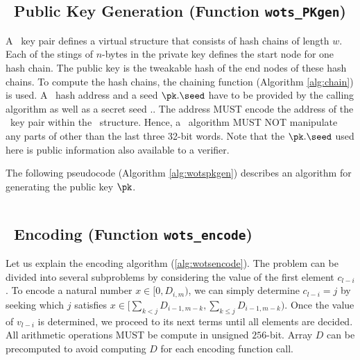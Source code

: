 \subsection{\WOTSCS\ Public Key Generation (Function \texttt{wots\_PKgen})}

A \WOTSCS\ key pair defines a virtual structure that consists of \len hash chains of length $w.$ Each of the \len stings of $n$-bytes in the private key defines the start node for one hash chain. The public key is the tweakable hash of the end nodes of these hash chains. To compute the hash chains, the chaining function (Algorithm \ref{alg:chain}) is used. A \WOTSCS\ hash address \ADRS and a seed $\pk.\seed$ have to be provided by the calling algorithm as well as a secret seed \sk.\seed. The address \ADRS MUST encode the address of the \WOTSCS\ key pair within the \SPHINCSA\ structure. Hence, a \WOTSCS\ algorithm MUST NOT manipulate any parts of \ADRS other than the last three 32-bit words. Note that the $\pk.\seed$ used here is public information also available to a verifier. 

The following pseudocode (Algorithm \ref{alg:wotspkgen}) describes an algorithm for generating the public key $\pk$.

\begin{algorithm}
\inputminted[breaklines,linenos,tabsize=2,mathescape,escapeinside=||]{C}{code/wots_PKgen.cs}
\caption{\texttt{wots\_PKgen} --- Generating a \WOTSCS\ public key.}
\label{alg:wotspkgen}
\end{algorithm}


\subsection{\WOTSCS\ Encoding (Function \texttt{wots\_encode})}

Let us explain the encoding algorithm (\cref{alg:wotsencode}). The problem can be divided into several subproblems by considering the value of the first element $c_{l-i}$. To encode a natural number $x\in [0,D_{i,m})$, we can simply determine $c_{l-i}=j$ by seeking which $j$ satisfies $x\in [\sum_{k<j}D_{i-1,m-k},\sum_{k\leq j}D_{i-1,m-k})$. Once the value of $v_{l-i}$ is determined, we proceed to its next terms until all elements are decided. All arithmetic operations MUST be compute in unsigned $256$-bit. Array $D$ can be precomputed to avoid computing $D$ for each encoding function call. 

\begin{algorithm}
\inputminted[breaklines,linenos,tabsize=2,mathescape,escapeinside=||]{C}{code/wots_encode.cs}
\caption{\texttt{wots\_encode} --- Encoding message to constant-sum encoding.}
\label{alg:wotsencode}
\end{algorithm}

